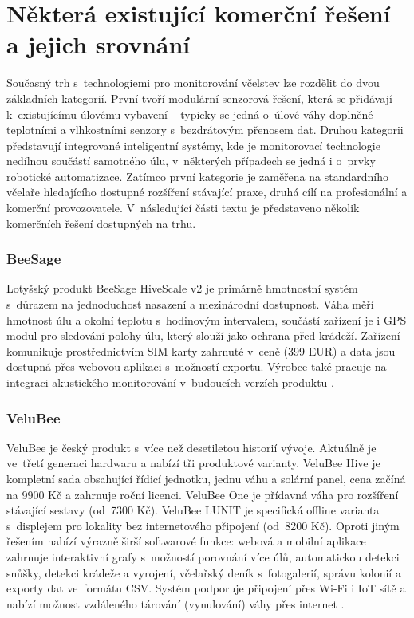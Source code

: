 \section{Některá existující komerční řešení a jejich srovnání} \label{sec:komercni_reseni}
Současný trh s~technologiemi pro monitorování včelstev lze rozdělit do dvou základních kategorií. První tvoří modulární senzorová řešení, která se přidávají k~existujícímu úlovému vybavení -- typicky se jedná o~úlové váhy doplněné teplotními a vlhkostními senzory s~bezdrátovým přenosem dat. Druhou kategorii představují integrované inteligentní systémy, kde je monitorovací technologie nedílnou součástí samotného úlu, v~některých případech se jedná i o~prvky robotické automatizace. Zatímco první kategorie je zaměřena na standardního včelaře hledajícího dostupné rozšíření stávající praxe, druhá cílí na profesionální a komerční provozovatele. V~následující části textu je představeno několik komerčních řešení dostupných na trhu.

\subsubsection*{BeeSage}
Lotyšský produkt BeeSage HiveScale v2 je primárně hmotnostní systém s~důrazem na jednoduchost nasazení a mezinárodní dostupnost. Váha měří hmotnost úlu a okolní teplotu s~hodinovým intervalem, součástí zařízení je i GPS modul pro sledování polohy úlu, který slouží jako ochrana před krádeží. Zařízení komunikuje prostřednictvím SIM karty zahrnuté v~ceně (399 EUR) a data jsou dostupná přes webovou aplikaci s~možností exportu. Výrobce také pracuje na integraci akustického monitorování v~budoucích verzích produktu \cite{beesage}. 

\subsubsection*{VeluBee}
VeluBee je český produkt s~více než desetiletou historií vývoje. Aktuálně je ve~třetí generaci hardwaru a nabízí tři produktové varianty. VeluBee Hive je kompletní sada obsahující řídicí jednotku, jednu váhu a solární panel, cena začíná na 9900 Kč a zahrnuje roční licenci. VeluBee One je přídavná váha pro rozšíření stávající sestavy (od~7300 Kč). VeluBee LUNIT je specifická offline varianta s~displejem pro lokality bez internetového připojení (od~8200 Kč). Oproti jiným řešením nabízí výrazně širší softwarové funkce: webová a mobilní aplikace zahrnuje interaktivní grafy s~možností porovnání více úlů, automatickou detekci snůšky, detekci krádeže a vyrojení, včelařský deník s~fotogalerií, správu kolonií a exporty dat ve~formátu CSV. Systém podporuje připojení přes Wi-Fi i IoT sítě a nabízí možnost vzdáleného tárování (vynulování) váhy přes internet \cite{velubee}.

